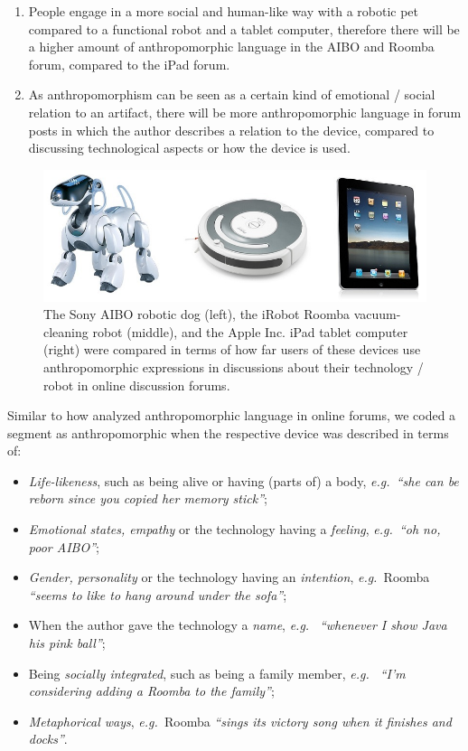 \documentclass{frontiersSCNS} %
\newcommand{\eg}{{\textit{e.g.~}}}
\begin{document}
\begin{enumerate}
    	\item People engage in a more social and human-like way with a robotic pet compared to a functional robot and a tablet computer, therefore there will be a higher amount of anthropomorphic language in the AIBO and Roomba forum, compared to the iPad forum.

    	\item As anthropomorphism can be seen as a certain kind of emotional / social relation to an artifact, there will be more anthropomorphic language in forum posts in which the author describes a relation to the device, compared to discussing technological aspects or how the device is used.
\end{enumerate}

\begin{figure}[b]
    \centering
    \includegraphics[width=0.5\columnwidth]{aibo-roomba-ipad_2.jpg}
    \caption{The Sony AIBO robotic dog (left), the iRobot Roomba vacuum-cleaning robot (middle), and the Apple Inc. iPad tablet computer (right) were compared in terms of how far users of these devices use anthropomorphic expressions in discussions about their technology / robot in online discussion forums.}
    \label{fig:aibo-roomba-ipad}
\end{figure}

Similar to how \cite{friedman_hardware_2003} analyzed anthropomorphic language
in online forums, we coded a segment as anthropomorphic when the respective
device was described in terms of:

\begin{itemize}
    \item \textit{Life-likeness}, such as being alive or having (parts of) a
        body, \eg \textit{``she can be reborn since you copied her memory
        stick''};
    \item \textit{Emotional states, empathy} or the technology having a
        \textit{feeling}, \eg \textit{``oh no, poor AIBO''};
    \item \textit{Gender, personality} or the technology having an
        \textit{intention}, \eg Roomba \textit{``seems to like to hang around
        under the sofa''};
    \item When the author gave the technology a \textit{name}, \eg
        \textit{``whenever I show Java his pink ball''};
    \item Being \textit{socially integrated}, such as being a family member, \eg
        \textit{``I'm considering adding a Roomba to the family''};
    \item \textit{Metaphorical ways}, \eg Roomba \textit{``sings its victory
        song when it finishes and docks''}.
\end{itemize}
\end{document}
